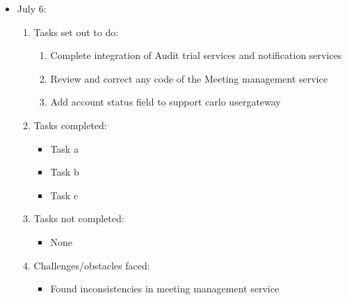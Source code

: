 	\begin{itemize}
		\item July 6:
		\begin{enumerate}
			\item Tasks set out to do:
			\begin{enumerate}
				\item Complete integration of  Audit trial services and notification services
				\item Review and correct any code of the Meeting management service
				\item Add account status field to support carlo usergateway
			\end{enumerate}
			\item Tasks completed:
			\begin{itemize}
				\item Task a
				\item Task b
				\item Task c
			\end{itemize}
			\item Tasks not completed:
			\begin{itemize}
				\item None
			\end{itemize}
			\item Challenges/obstacles faced:
			\begin{itemize}
				\item Found inconsistencies in meeting management service
			\end{itemize}			
		\end{enumerate}
	\end{itemize}
	
